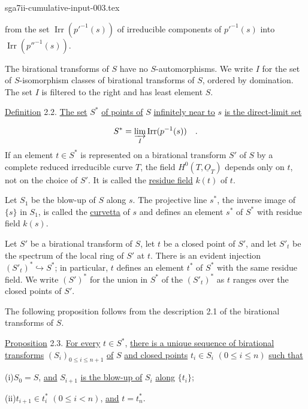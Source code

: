 \begin{filecontents*}{sga7ii-cumulative-input-003.tex}

from the set $\operatorname{Irr}(p'^{-1}(s))$ of irreducible components of
$p'^{-1}(s)$ into $\operatorname{Irr}(p''^{-1}(s))$.

The birational transforms of $S$ have no $S$-automorphisms.  We write $I$ for the
set of $S$-isomorphism classes of birational transforms of $S$, ordered by
domination.  The set $I$ is filtered to the right and has least element $S$.

\underline{Definition} 2.2. \underline{The set} $S^*$ \underline{of points of}
$S$ \underline{infinitely near to} $s$ \underline{is the direct-limit set}

\begin{equation*}
S^*=\varinjlim_I\operatorname{Irr}(p^{-1}(s)) \quad .
\end{equation*}
If an element $t\in S^*$ is represented on a birational transform $S'$ of $S$ by
a complete reduced irreducible curve $T$, the field
$H^0(T,\underline{O}_T)$ depends only on $t$, not on the choice of $S'$.  It is
called the \underline{residue field} $k(t)$ of $t$.

Let $S_1$ be the blow-up of $S$ along $s$.  The projective line $s^*$, the inverse
image of $\{s\}$ in $S_1$, is called the \underline{curvetta} of $s$ and defines
an element $s^*$ of $S^*$ with residue field $k(s)$.

Let $S'$ be a birational transform of $S$, let $t$ be a closed point of $S'$, and
let $S'_t$ be the spectrum of the local ring of $S'$ at $t$.  There is an evident
injection $(S'_t)^*\hookrightarrow S^*$; in particular, $t$ defines an element
$t^*$ of $S^*$ with the same residue field.  We write $(S')^*$ for the union in
$S^*$ of the $(S'_t)^*$ as $t$ ranges over the closed points of $S'$.

The following proposition follows from the description 2.1 of the birational
transforms of $S$.


\underline{Proposition} 2.3. \underline{For every} $t\in S^*$,
\underline{there is a unique sequence of birational transforms}
$(S_i)_{0\leq i\leq n+1}$ \underline{of} $S$ \underline{and closed points}
$t_i\in S_i$ $(0\leq i\leq n)$ \underline{such that}

(i)\quad $S_0=S$, \underline{and} $S_{i+1}$ \underline{is the blow-up of} $S_i$
\underline{along} $\{t_i\}$;

(ii)\quad $t_{i+1}\in t_i^*$ $(0\leq i<n)$, \underline{and} $t=t_n^*$.


\end{filecontents*}
